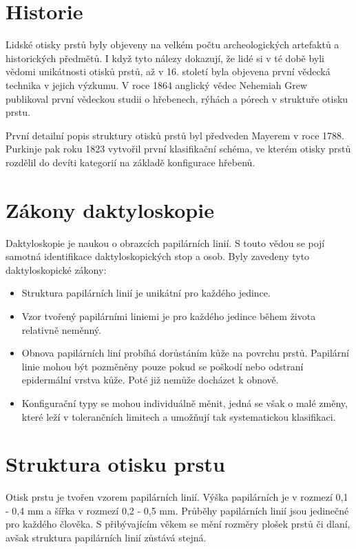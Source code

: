 \section{Historie}
Lidské otisky prstů byly objeveny na velkém počtu archeologických artefaktů a historických předmětů. I když tyto nálezy dokazují, že lidé si v té době byli vědomi unikátnosti otisků prstů, až v 16. století byla objevena první vědecká technika v jejich výzkumu. V roce 1864 anglický vědec Nehemiah Grew publikoval první vědeckou studii o hřebenech, rýhách a pórech v struktuře otisku prstu.

První detailní popis struktury otisků prstů byl předveden Mayerem v roce 1788. Purkinje pak roku 1823 vytvořil první klasifikační schéma, ve kterém otisky prstů rozdělil do devíti kategorií na základě konfigurace hřebenů. \cite{Maltoni2009}

\section{Zákony daktyloskopie}
Daktyloskopie je naukou o obrazcích papilárních linií. S touto vědou se pojí samotná identifikace daktyloskopických stop a osob. \cite{PolicieDaktyloskopie} Byly zavedeny tyto daktyloskopické zákony: \cite{Drahansky}
\begin{itemize}
    \item Struktura papilárních linií je unikátní pro každého jedince.
    \item Vzor tvořený papilárními liniemi je pro každého jedince během života relativně neměnný.
    \item Obnova papilárních liní probíhá dorůstáním kůže na povrchu prstů. Papilární linie mohou být pozměněny pouze pokud se poškodí nebo odstraní epidermální vrstva kůže. Poté již nemůže docházet k obnově.
    \item Konfigurační typy se mohou individuálně měnit, jedná se však o malé změny, které leží v tolerančních limitech a umožňují tak systematickou klasifikaci.
\end{itemize}

\section{Struktura otisku prstu}
Otisk prstu je tvořen vzorem papilárních linií. Výška papilárních je v rozmezí 0,1 - 0,4 mm a šířka v rozmezí 0,2 - 0,5 mm. \cite{Drahansky} Průběhy papilárních linií jsou jedinečné pro každého člověka. S přibývajícím věkem se mění rozměry plošek prstů či dlaní, avšak struktura papilárních linií zůstává stejná.

